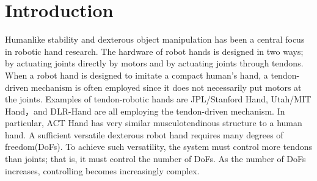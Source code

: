 \documentclass{llncs}
\begin{document}
\section{Introduction} %
\label{sec:introduction}
Humanlike stability and dexterous object manipulation has been a central focus in robotic hand research.
The hardware of robot hands is designed in two ways;
by actuating joints directly by motors and by actuating joints through tendons.
When a robot hand is designed to imitate a compact human's hand,
a tendon-driven mechanism is often employed
since it does not necessarily put motors at the joints.
Examples of tendon-robotic hands are JPL/Stanford Hand\cite{salisbury1982}, Utah/MIT
Hand\cite{Jacobsen1986}，and DLR-Hand\cite{Butterfass2001} are all
employing the tendon-driven mechanism.
In particular, ACT Hand\cite{vande2004} has very similar musculotendinous
structure to a human hand.
A sufficient versatile dexterous robot hand requires many degrees of freedom(DoFs).
To achieve such versatility, the system must control more tendons than joints;
that is, it must control the number of DoFs.
As the number of DoFs increases, controlling becomes increasingly complex.
\end{document}
